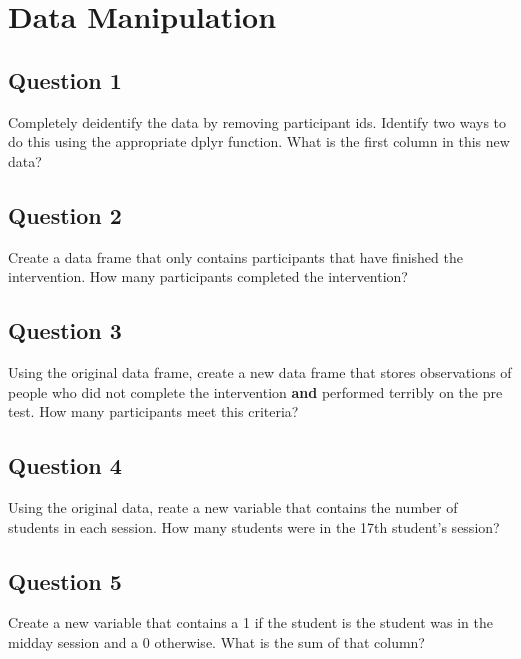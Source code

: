\documentclass[]{book}
\theoremstyle{definition}
\theoremstyle{definition}
\theoremstyle{definition}
\theoremstyle{remark}
\begin{document}
\hypertarget{data-manipulation}{%
\section{Data Manipulation}\label{data-manipulation}}

\hypertarget{question-1}{%
\subsection{Question 1}\label{question-1}}

Completely deidentify the data by removing participant ids. Identify two ways to do this using the appropriate dplyr function. What is the first column in this new data?

\hypertarget{question-2}{%
\subsection{Question 2}\label{question-2}}

Create a data frame that only contains participants that have finished the intervention. How many participants completed the intervention?

\hypertarget{question-3}{%
\subsection{Question 3}\label{question-3}}

Using the original data frame, create a new data frame that stores observations of people who did not complete the intervention \textbf{and} performed terribly on the pre test. How many participants meet this criteria?

\hypertarget{question-4}{%
\subsection{Question 4}\label{question-4}}

Using the original data, reate a new variable that contains the number of students in each session. How many students were in the 17th student's session?

\hypertarget{question-5}{%
\subsection{Question 5}\label{question-5}}

Create a new variable that contains a 1 if the student is the student was in the midday session and a 0 otherwise. What is the sum of that column?
\end{document}
